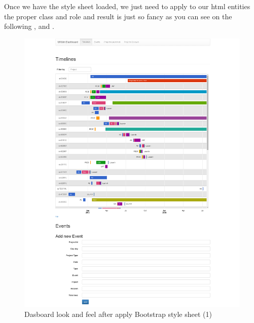 Once we have the style sheet loaded, we just need to apply to our html entities
the proper class and role and result is just so fancy as you can see on the
following ,
 and .

\begin{figure}[ht!]
	\centering
   	\includegraphics[width=1\textwidth]{./resources/dashboard_after_bootstrap_1.png}
   	\caption{Dasboard look and feel after apply Bootstrap style sheet (1)}
   	\label{f_facelift_bootstrap}
\end{figure}

